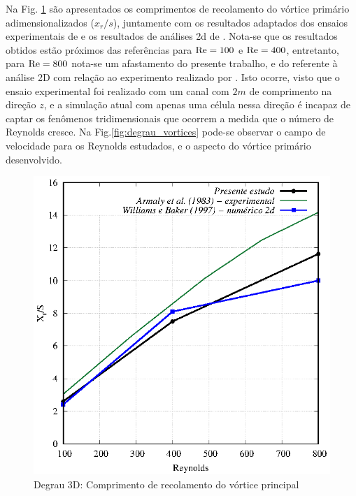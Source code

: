 \documentclass[tese_patricia]{subfiles}
\begin{document}
Na Fig. \ref{fig:degrau_com_recl} são apresentados os comprimentos de recolamento do vórtice primário adimensionalizados ($x_{r}/s$), juntamente com os resultados adaptados dos ensaios experimentais de  e os resultados de análises 2d de . Nota-se que os resultados obtidos estão próximos das referências para $\mathrm{Re} = 100$ e $\mathrm{Re} =400$, entretanto, para $\mathrm{Re} = 800$ nota-se um afastamento do presente trabalho, e do referente à análise 2D com relação ao experimento realizado por . Isto ocorre, visto que o ensaio experimental foi realizado com um canal com $2m$ de comprimento na direção $z$, e a simulação atual com apenas uma célula nessa direção é incapaz de captar os fenômenos tridimensionais que ocorrem a medida que o número de Reynolds cresce. Na Fig.\ref {fig:degrau_vortices} pode-se observar o campo de velocidade para os Reynolds estudados, e o aspecto do vórtice primário desenvolvido.


\begin{figure}[htb!]
	\centering
	\includegraphics[scale=1.2,trim=0cm 0cm 0cm 0cm, clip=true]{Imagens/Cap2/comvort.eps}
	\caption{Degrau 3D: Comprimento de recolamento do v\'ortice principal}
	\label{fig:degrau_com_recl}
\end{figure}
\end{document}
